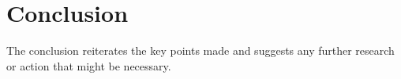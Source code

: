 
\chapter{Conclusion}
The conclusion reiterates the key points made and suggests any further research or action that might be necessary.
